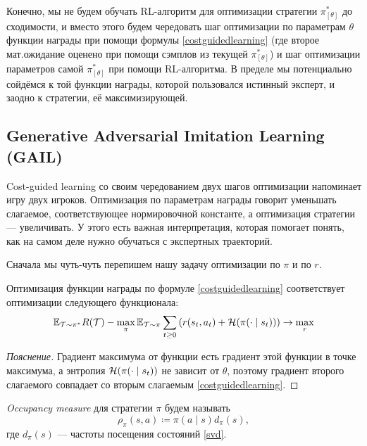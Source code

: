 Конечно, мы не будем обучать RL-алгоритм для оптимизации стратегии $\pi^*_{[\theta]}$ до сходимости, и вместо этого будем чередовать шаг оптимизации по параметрам $\theta$ функции награды при помощи формулы \eqref{costguidedlearning} (где второе мат.ожидание оценено при помощи сэмплов из текущей $\pi^*_{[\theta]}$) и шаг оптимизации параметров самой $\pi^*_{[\theta]}$ при помощи RL-алгоритма. В пределе мы потенциально сойдёмся к той функции награды, которой пользовался истинный эксперт, и заодно к стратегии, её максимизирующей.

\subsection{Generative Adversarial Imitation Learning (GAIL)}

Cost-guided learning со своим чередованием двух шагов оптимизации напоминает игру двух игроков. Оптимизация по параметрам награды говорит уменьшать слагаемое, соответствующее нормировочной константе, а оптимизация стратегии --- увеличивать. У этого есть важная интерпретация, которая помогает понять, как на самом деле нужно обучаться с экспертных траекторий.

Сначала мы чуть-чуть перепишем нашу задачу оптимизации по $\pi$ и по $r$.

\begin{proposition}
Оптимизация функции награды по формуле \eqref{costguidedlearning} соответствует оптимизации следующего функционала:
\begin{equation}\label{irl_dual}
\mathbb{E}_{\mathcal{T} \sim \pi^*} R(\mathcal{T}) - \max_{\pi} \mathbb{E}_{\mathcal{T} \sim \pi} \sum_{t \ge 0} \left( r(s_t, a_t) + \mathcal{H}(\pi(\cdot \mid s_t)) \right) \to \max_{r}
\end{equation}
\begin{proof}[Пояснение]
Градиент максимума от функции есть градиент этой функции в точке максимума, а энтропия $\mathcal{H}(\pi(\cdot \mid s_t))$ не зависит от $\theta$, поэтому градиент второго слагаемого совпадает со вторым слагаемым \eqref{costguidedlearning}.
\end{proof}
\end{proposition}

\begin{definition}
\emph{Occupancy measure} для стратегии $\pi$ будем называть
\begin{equation}\label{occupancymeasure}
\rho_\pi(s, a) \coloneqq \pi(a \mid s)d_{\pi}(s),
\end{equation}
где $d_\pi(s)$ --- частоты посещения состояний \eqref{svd}.
\end{definition}

